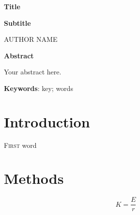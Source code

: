 \documentclass[12pt]{extarticle}
\begin{document}


{\selectfont
\color{Mahogany}
\centerline{\huge{\textbf{Title}}} 
\bigskip
\centerline{\Large{\textbf{Subtitle}}}
}

\bigskip
\bigskip

\centerline{ \Large AUTHOR NAME\footnotemark}


\bigskip
\bigskip
\bigskip

\thispagestyle{fancy}

\bigskip
\bigskip
\bigskip

\noindent \textbf{Abstract}

Your abstract here.

\bigskip

\textbf{Keywords}: key; words

\bigskip
\bigskip
\newpage

\section{Introduction}

\lettrine[lines=3,lraise=0.1, nindent=0em]{F}{irst} word \lipsum[1]


\lipsum[1]

\section{Methods}
\lipsum[1]

\begin{equation}
K = \frac{E}{r}
\end{equation}
\end{document}
